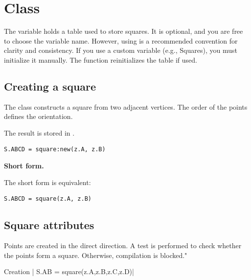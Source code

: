 \newpage
\section{Class }
The variable  holds a table used to store squares. It is optional, and you are free to choose the variable name. However, using  is a recommended convention for clarity and consistency. If you use a custom variable (e.g., Squares), you must initialize it manually. The  function reinitializes the  table if used.


\subsection{Creating a square}
\label{sub:creating_a_square}

The  class constructs a square from two adjacent vertices. The order of the points defines the orientation.


\medskip
The result is stored in .

\begin{mybox}
\begin{verbatim}
S.ABCD = square:new(z.A, z.B)
\end{verbatim}
\end{mybox}

\textbf{Short form.}

The short form  is equivalent:

\begin{mybox}
\begin{verbatim}
S.ABCD = square(z.A, z.B)
\end{verbatim}
\end{mybox}

\subsection{Square attributes}
\label{sub:square_attributes}
Points are created in the direct direction. A test is performed to check whether the points form a square. Otherwise, compilation is blocked."
\begin{mybox}
Creation | S.AB = square(z.A,z.B,z.C,z.D)|
\end{mybox}


